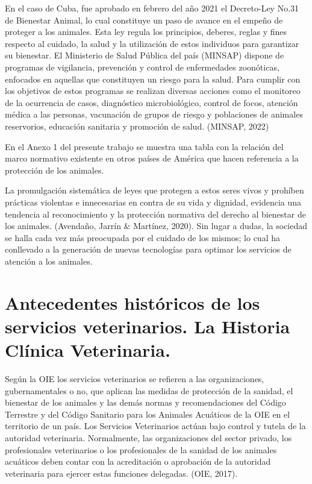 En el caso de Cuba, fue aprobado en febrero del año 2021 el Decreto-Ley No.31 de Bienestar Animal, lo cual constituye un paso de avance en el empeño de proteger a los animales. Esta ley regula los principios, deberes, reglas y fines respecto al cuidado, la salud y la utilización de estos individuos para garantizar su bienestar. El Ministerio de Salud Pública del país (MINSAP) dispone de programas de vigilancia, prevención y control de enfermedades zoonóticas, enfocados en aquellas que constituyen un riesgo para la salud. Para cumplir con los objetivos de estos programas se realizan diversas acciones como el monitoreo de la ocurrencia de casos, diagnóstico microbiológico, control de focos, atención médica a las personas, vacunación de grupos de riesgo y poblaciones de animales reservorios, educación sanitaria y promoción de salud. (MINSAP, 2022) 

En el Anexo 1 del presente trabajo se muestra una tabla con la relación del marco normativo existente en otros países de América que hacen referencia a la protección de los animales. 

La promulgación sistemática de leyes que protegen a estos seres vivos y prohíben prácticas violentas e innecesarias en contra de su vida y dignidad, evidencia una tendencia al reconocimiento y la protección normativa del derecho al bienestar de los animales. (Avendaño, Jarrín \& Martínez, 2020). Sin lugar a dudas, la sociedad se halla cada vez más preocupada por el cuidado de los mismos; lo cual ha conllevado a la generación de nuevas tecnologías para optimar los servicios de atención a los animales.  

\section{Antecedentes históricos de los servicios \newline veterinarios. La Historia Clínica Veterinaria.  }

Según la OIE los servicios veterinarios se refieren a las organizaciones, gubernamentales o no, que aplican las medidas de protección de la sanidad, el bienestar de los animales y las demás normas y recomendaciones del Código Terrestre y del Código Sanitario para los Animales Acuáticos de la OIE en el territorio de un país. Los Servicios Veterinarios actúan bajo control y tutela de la autoridad veterinaria. Normalmente, las organizaciones del sector privado, los profesionales veterinarios o los profesionales de la sanidad de los animales acuáticos deben contar con la acreditación o aprobación de la autoridad veterinaria para ejercer estas funciones delegadas. (OIE, 2017). 

